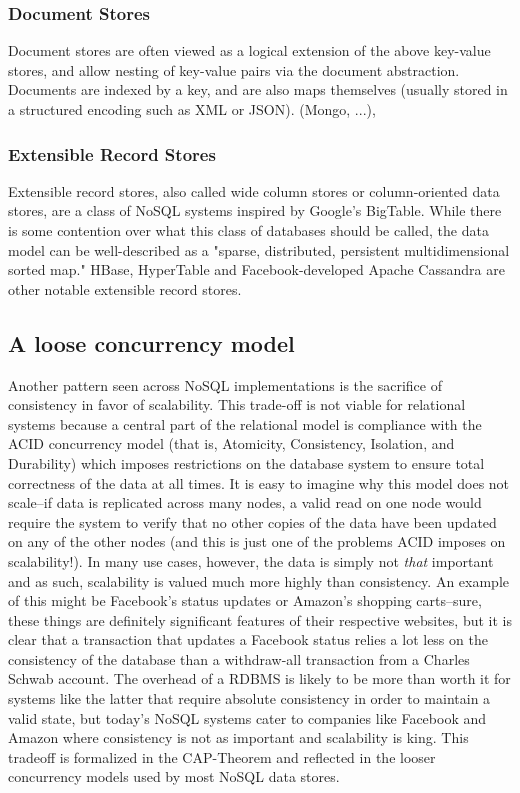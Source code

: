 \documentclass[11pt,a4paper]{report}
\begin{document}
 
\subsubsection{Document Stores}
Document stores are often viewed as a logical extension of the above key-value stores, and allow nesting of key-value pairs via the document abstraction. Documents are indexed by a key, and are also maps themselves (usually stored in a structured encoding such as XML or JSON). (Mongo, ...),


 
\subsubsection{Extensible Record Stores}
Extensible record stores, also called wide column stores or column-oriented data stores, are a class of NoSQL systems inspired by Google's BigTable. While there is some contention over what this class of databases should be called, the data model can be well-described as a "sparse, distributed, persistent multidimensional sorted map."\cite{chang2008bigtable} HBase, HyperTable and Facebook-developed Apache Cassandra are other notable extensible record stores.


\subsection{A loose concurrency model}
Another pattern seen across NoSQL implementations is the sacrifice of consistency in favor of scalability. This trade-off is not viable for relational systems because a central part of the relational model is compliance with the ACID concurrency model (that is, Atomicity, Consistency, Isolation, and Durability) which imposes restrictions on the database system to ensure total correctness of the data at all times. It is easy to imagine why this model does not scale--if data is replicated across many nodes, a valid read on one node would require the system to verify that no other copies of the data have been updated on any of the other nodes (and this is just one of the problems ACID imposes on scalability!).  In many use cases, however, the data is simply not \textit{that} important and as such, scalability is valued much more highly than consistency. An example of this might be Facebook's status updates or Amazon's shopping carts--sure, these things are definitely significant features of their respective websites, but it is clear that a transaction that updates a Facebook status relies a lot less on the consistency of the database than a withdraw-all transaction from a Charles Schwab account. The overhead of a RDBMS is likely to be more than worth it for systems like the latter that require absolute consistency in order to maintain a valid state, but today's NoSQL systems cater to companies like Facebook and Amazon where consistency is not as important and scalability is king. This tradeoff is formalized in the CAP-Theorem and reflected in the looser concurrency models used by most NoSQL data stores.
\end{document}
